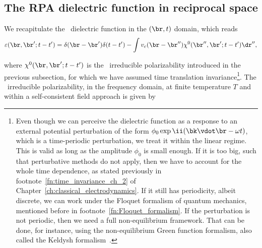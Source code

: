 \subsection{The RPA dielectric function in reciprocal space}
\label{subsec:rpa_dielectric_function}

We recapitulate the \rpa~dielectric function in the $(\br,t)$ domain, which reads~\cite{Bruus_Flensberg_2004,Cohen_Louie_2016}
\vspace{-0.2cm}
\begin{equation}
    \label{eq:dielectric_function_real_time}
    \varepsilon (\br,\br';t-t') = \delta(\br - \br') \delta(t-t') - \int  v_c(\br - \br'') \chi^0 (\br'',\br';t-t') \dr'',
\end{equation}

\noindent where $\chi^0 (\br,\br';t-t')$ is the \rpa~irreducible polarizability introduced in the previous subsection, for which we have assumed time translation invariance\footnote{Even though we can perceive the dielectric function as a response to an external potential perturbation of the form $\phi_0 \exp{\ii(\bk \vdot \br - \omega t)}$, which is a time-periodic perturbation, we treat it within the linear regime. This is valid as long as the amplitude $\phi_0$ is small enough. If it is too big, such that perturbative methods do not apply, then we have to account for the whole time dependence, as stated previously in footnote~\ref{fn:time_invariance_ch_2} of Chapter~\ref{ch:classical_electrodynamics}. If it still has periodicity, albeit discrete, we can work under the Floquet formalism of quantum mechanics, mentioned before in footnote~\ref{fn:Floquet_formalism}. If the perturbation is not periodic, then we need a full non-equilibrium framework. That can be done, for instance, using the non-equilibrium Green function formalism, also called the Keldysh formalism~\cite{Di_Ventra_2008}.}.
The \rpa~irreducible polarizability, in the frequency domain, at finite temperature $T$ and within a self-consistent field approach is given by~\cite{Cohen_Louie_2016}

